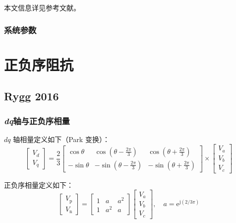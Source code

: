 \documentclass[12pt, a4paper, UTF8, fontset=adobe, scheme=chinese, heading=true, oneside]{ctexbook} %
\begin{document}
本文信息详见参考文献\cite{wang2017}。

\subsection{系统参数}


\chapter{正负序阻抗}

\section{Rygg 2016}

\subsection{\textit{dq}轴与正负序相量}

$dq$ 轴相量定义如下（Park 变换）：
\begin{equation}
  \label{eq:dq-transform}
  \begin{bmatrix}
    V_d \\ V_q
  \end{bmatrix}
  = \frac{2}{3}
  \begin{bmatrix}
    \cos \theta & \cos \left( \theta-\frac{2\pi}{3} \right) & \cos \left( \theta+\frac{2\pi}{3} \right) \\
    -\sin \theta & -\sin \left( \theta-\frac{2\pi}{3} \right) & -\sin \left( \theta+\frac{2\pi}{3} \right)
  \end{bmatrix}
  \times
  \begin{bmatrix}
    V_a \\ V_b \\ V_c
  \end{bmatrix}
\end{equation}

正负序相量定义如下：
\begin{equation}
  \label{eq:np-transform}
  \begin{bmatrix}
    V_{\mathrm{p}} \\ V_{\mathrm{n}}
  \end{bmatrix} =
  \begin{bmatrix}
    1 & a & a^2 \\
    1 & a^2 & a
  \end{bmatrix}
  \begin{bmatrix}
    V_a \\ V_b \\ V_c
  \end{bmatrix}, \quad a = \mathrm{e}^{\mathrm{j}(2/3\pi)}
\end{equation}
\end{document}
